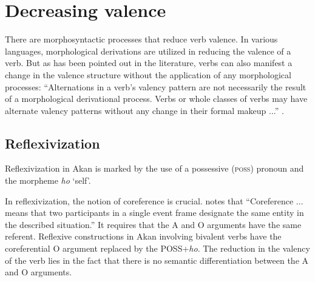 \documentclass[output=paper]{langsci/langscibook}
\begin{document}
\ea
\label{ex:27.osam}
	\z

	\z
\z

\section{Decreasing valence}\label{§4:decreasing.osam}

There are morphosyntactic processes that reduce verb valence. In various languages, morphological derivations are utilized in reducing the valence of a verb. But as has been pointed out in the literature, verbs can also manifest a change in the valence structure without the application of any morphological processes: ``Alternations in a verb's valency pattern are not necessarily the result of a morphological derivational process. Verbs or whole classes of verbs may have alternate valency patterns without any change in their formal makeup ...'' \citep[1131]{haspelmathmuellerbardey2004}.

\subsection{Reflexivization}\label{§4.1:reflexivization.osam}

Reflexivization in Akan is marked by the use of a possessive (\textsc{poss}) pronoun and the morpheme \textit{ho} `self'.

\ea
\label{ex:28.osam}
	\z

	\z
\z


In reflexivization, the notion of coreference is crucial. \citet[44]{kemmer1993} notes that ``Coreference ...  means that two participants in a single event frame designate the same entity in the described situation.''  It requires that the A and O arguments have the same referent. Reflexive constructions in Akan involving bivalent verbs have the coreferential O argument replaced by the POSS+\textit{ho}.  The reduction in the valency of the verb lies in the fact that there is no semantic differentiation between the A and O arguments. 
\end{document}
